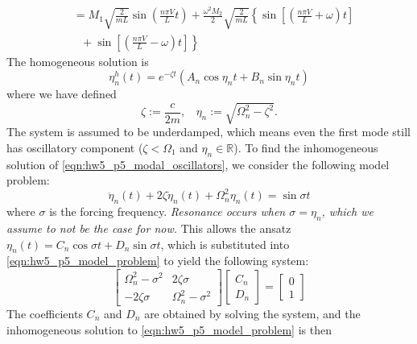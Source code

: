 \begin{enumerate}[(i)]
{\begin{equation}
\begin{aligned}
        &= M_1 \sqrt{\frac{2}{mL}} \sin \left(\frac{n\pi V}{L}t\right) + \frac{\omega^2 M_2}{2}\sqrt{\frac{2}{mL}} \left\{\sin \left[\left(\frac{n\pi V}{L} + \omega\right) t\right] \right. \\
        &~~~+ \left. \sin \left[\left(\frac{n\pi V}{L} - \omega\right) t\right] \right\}
    \end{aligned}
    \end{equation}
    The homogeneous solution is 
    \begin{equation}
        \eta_n^h(t) = e^{-\zeta t} \left(A_n \cos \eta_n t + B_n \sin \eta_n t \right)
    \end{equation}
    where we have defined 
    \begin{equation}
        \zeta := \frac{c}{2m}, ~~~~ \eta_n := \sqrt{\Omega_n^2 - \zeta^2}.
    \end{equation}
    The system is assumed to be underdamped, which means even the first mode still has oscillatory component ($\zeta < \Omega_1$ and $\eta_n \in \mathbb{R}$). 
    To find the inhomogeneous solution of \cref{eqn:hw5_p5_modal_oscillators}, we consider the following model problem:
    \begin{equation}\label{eqn:hw5_p5_model_problem}
        \ddot{\eta}_n(t) + 2\zeta \dot{\eta}_n(t) + \Omega_n^2 \eta_n(t) = \sin \sigma t
    \end{equation}
    where $\sigma$ is the forcing frequency. 
    \emph{Resonance occurs when $\sigma = \eta_n$, which we assume to not be the case for now. }
    This allows the ansatz $\eta_n(t) = C_n \cos\sigma t + D_n \sin\sigma t$, which is substituted into \cref{eqn:hw5_p5_model_problem} to yield the following system:
    \begin{equation}
        \begin{bmatrix}
            \Omega_n^2 - \sigma^2 & 2\zeta \sigma \\
            -2\zeta \sigma & \Omega_n^2 - \sigma^2
        \end{bmatrix} \begin{bmatrix}
            C_n \\ D_n
        \end{bmatrix} = \begin{bmatrix}
            0 \\ 1
        \end{bmatrix}
    \end{equation}
    The coefficients $C_n$ and $D_n$ are obtained by solving the system, and the inhomogeneous solution to \cref{eqn:hw5_p5_model_problem} is then 
}
\end{enumerate}
